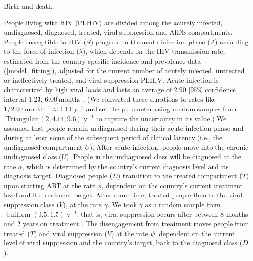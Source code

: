 \documentclass[11pt]{article}
\DeclareMathOperator{\Uniform}{Uniform}
\DeclareMathOperator{\Triangular}{Triangular}
\begin{document}
Birth and death.

People living with HIV (PLHIV) are divided among the acutely infected,
undiagnosed, diagnosed, treated, viral suppression and AIDS
compartments. People susceptible to HIV ($S$) progress to the
acute-infection phase ($A$) according to the force of infection
($\lambda$), which depends on the HIV transmission rate, estimated
from the country-specific incidence and prevalence data
(\autoref{model_fitting}), adjusted for the current number of acutely
infected, untreated or ineffectively treated, and viral suppression
PLHIV.  Acute infection is characterized by high viral loads and lasts
an average of 2.90 [95\% confidence interval 1.23, 6.00]\;months
\cite{Hollingsworth2008-iy}.  (We converted these durations to rates
like $1 / 2.90\;\text{month$^{-1}$} \approx 4.14\;\text{y$^{-1}$}$ and
set the parameter using random samples from
$\Triangular(2, 4.14, 9.6)\;\text{y$^{-1}$}$ to capture the
uncertainty in its value.)  We assumed that people remain undiagnosed
during their acute infection phase and during at least some of the
subsequent period of clinical latency (i.e., the undiagnosed
compartment $U$). After acute infection, people move into the chronic
undiagnosed class ($U$).  People in the undiagnosed class will be
diagnosed at the rate $\alpha$, which is determined by the country's
current diagnosis level and its diagnosis target.  Diagnosed people
($D$) transition to the treated compartment ($T$) upon starting ART at
the rate $\phi$, dependent on the country's current treatment level
and its treatment target.  After some time, treated people then to the
viral-suppression class ($V$), at the rate $\gamma$.  We took $\gamma$
as a random sample from $\Uniform(0.5, 1.5)\;\text{y$^{-1}$}$, that
is, viral suppression occurs after between 8 months and 2 years on
treatment \cite{Currie2009-yz}.  The disengagement from treatment
moves people from treated ($T$) and viral suppression ($V$) at the
rate $\psi$, dependent on the current level of viral suppression and
the country's target, back to the diagnosed class ($D$).
\end{document}
